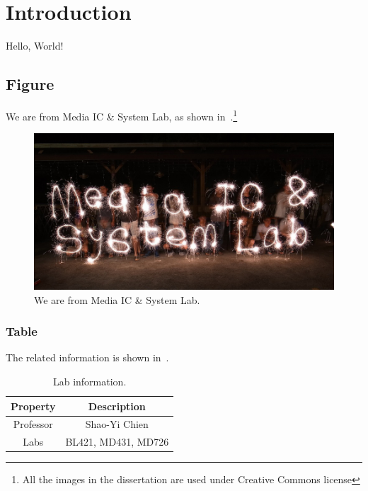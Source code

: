 \chapter{Introduction}
\label{ch:intro}
Hello, World!

\section{Figure}
\label{sec:figure}
We are from Media IC \& System Lab, as shown in~.\footnote{All the images in the dissertation are used under Creative Commons license}


\begin{figure}
\begin{center}
\includegraphics[width=0.8\linewidth]{inc/1_introduction/figure/misl.jpg}
\end{center}
\caption{
We are from Media IC \& System Lab.
}
\label{fig:misl}
\end{figure}


\subsection{Table}
\label{sec:picture}
The related information is shown in~.

\begin{table}[p]
\horgap{4.5pt}
\caption{Lab information.}
\vspace{5pt}
\label{tab:lab_information}
\centering
\footnotesize 
\begin{tabular}{cc}
\toprule
Property & Description \\
\midrule
Professor & Shao-Yi Chien \\
Labs & BL421, MD431, MD726 \\
\bottomrule
\end{tabular}
\end{table}
